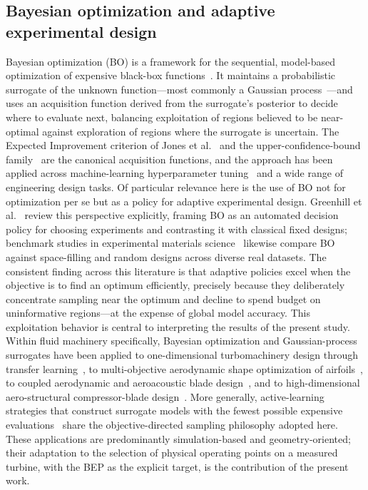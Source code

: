 \documentclass[preprint,12pt]{elsarticle}
\begin{document}
\subsection{Bayesian optimization and adaptive experimental design}
Bayesian optimization (BO) is a framework for the sequential, model-based
optimization of expensive black-box functions~\cite{jones1998ego,shahriari2016boreview}.
It maintains a probabilistic surrogate of the unknown function---most commonly a
Gaussian process~\cite{rasmussen2006gpml}---and uses an acquisition function derived
from the surrogate's posterior to decide where to evaluate next, balancing
exploitation of regions believed to be near-optimal against exploration of regions
where the surrogate is uncertain. The Expected Improvement criterion of Jones et
al.~\cite{jones1998ego} and the upper-confidence-bound family~\cite{srinivas2012ucb}
are the canonical acquisition functions, and the approach has been applied across
machine-learning hyperparameter tuning~\cite{snoek2012practicalbo} and a wide range
of engineering design tasks. Of particular relevance here is the use of BO not for
optimization per se but as a policy for adaptive experimental design. Greenhill et
al.~\cite{greenhill2020boreview} review this perspective explicitly, framing BO as an
automated decision policy for choosing experiments and contrasting it with classical
fixed designs; benchmark studies in experimental materials
science~\cite{liang2021benchmarkbo} likewise compare BO against space-filling and
random designs across diverse real datasets. The consistent finding across this
literature is that adaptive policies excel when the objective is to find an optimum
efficiently, precisely because they deliberately concentrate sampling near the
optimum and decline to spend budget on uninformative regions---at the expense of
global model accuracy. This exploitation behavior is central to interpreting the
results of the present study. Within fluid machinery specifically, Bayesian
optimization and Gaussian-process surrogates have been applied to one-dimensional
turbomachinery design through transfer learning~\cite{chen2022transferbo}, to
multi-objective aerodynamic shape optimization of airfoils~\cite{liu2022airfoilbo}, to
coupled aerodynamic and aeroacoustic blade design~\cite{lim2022aeroacoustic}, and to
high-dimensional aero-structural compressor-blade design~\cite{pretsch2025compressor}.
More generally, active-learning strategies that construct surrogate models with the
fewest possible expensive evaluations~\cite{guo2024activelearning} share the
objective-directed sampling philosophy adopted here. These applications are
predominantly simulation-based and geometry-oriented; their adaptation to the
selection of physical operating points on a measured turbine, with the BEP as the
explicit target, is the contribution of the present work.
\end{document}
